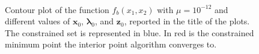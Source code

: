 \documentclass[a4paper,11pt]{article}
\begin{document}
\begin{figure}[H]
	\centering
	 \
	 \\
	\caption{Contour plot of the function $f_{b}(x_{1},x_{2})$ with $\mu=10^{-12}$ and different values of $\textbf{x}_{0}$, $\boldsymbol{\lambda}_{0}$, and $\textbf{z}_{0}$, reported in the title of the plots. The constrained set is represented in blue. In red is the constrained minimum point the interior point algorithm converges to.}
	\label{Fig:func_b_diff_x0_non_conv}
\end{figure}
\end{document}
